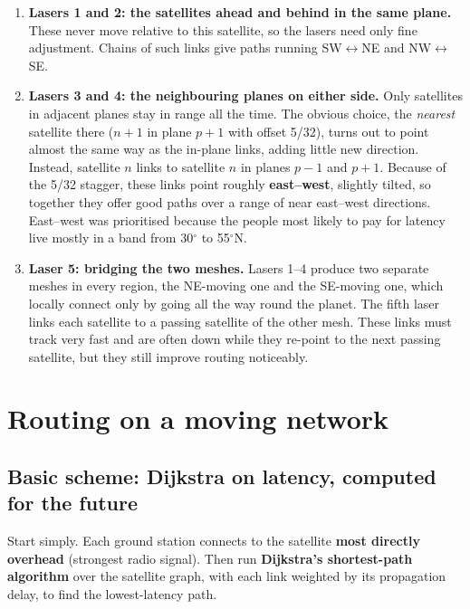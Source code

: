\begin{enumerate}
  \item \textbf{Lasers 1 and 2: the satellites ahead and behind in the same plane.} These never move relative to this satellite, so the lasers need only fine
        adjustment. Chains of such links give paths running SW$\leftrightarrow$NE and NW$\leftrightarrow$SE.
  \item \textbf{Lasers 3 and 4: the neighbouring planes on either side.} Only satellites in adjacent planes stay in range all the time. The obvious choice, the
        \emph{nearest} satellite there ($n+1$ in plane $p+1$ with offset 5/32), turns out to point almost the same way as the in-plane links, adding little new
        direction. Instead, satellite $n$ links to satellite $n$ in planes $p-1$ and $p+1$. Because of the 5/32 stagger, these links point roughly
        \textbf{east--west}, slightly tilted, so together they offer good paths over a range of near east--west directions. East--west was prioritised because the
        people most likely to pay for latency live mostly in a band from 30$^\circ$ to 55$^\circ$N.
  \item \textbf{Laser 5: bridging the two meshes.} Lasers 1--4 produce two separate meshes in every region, the NE-moving one and the SE-moving one, which locally connect
        only by going all the way round the planet. The fifth laser links each satellite to a passing satellite of the other mesh. These links must track very fast and
        are often down while they re-point to the next passing satellite, but they still improve routing noticeably.
\end{enumerate}


\section{Routing on a moving network}

\subsection{Basic scheme: Dijkstra on latency, computed for the future}
Start simply. Each ground station connects to the satellite \textbf{most directly overhead} (strongest radio signal). Then run \textbf{Dijkstra's shortest-path
algorithm} over the satellite graph, with each link weighted by its propagation delay, to find the lowest-latency path.

